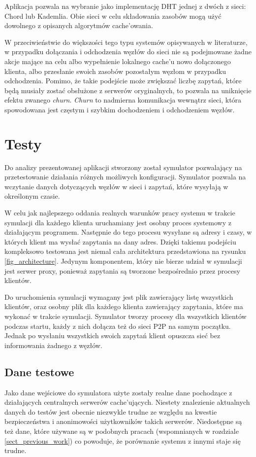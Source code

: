 \documentclass[a4paper,11pt]{scrartcl}
\newcommand{\s}{ }
\newcommand{\keszu}{cache'u}
\newcommand{\keszujacych}{cache'ujących}
\newcommand{\keszowania}{cache'owania}
\begin{document}
Aplikacja pozwala na wybranie jako implementację DHT jednej z dwóch z sieci: Chord lub Kademlia. Obie sieci w celu składowania zasobów mogą użyć dowolnego z opisanych algorytmów \keszowania.

W przeciwieństwie do większości tego typu systemów opisywanych w literaturze, w przypadku dołączania i odchodzenia węzłów do sieci nie są podejmowane żadne akcje mające na celu albo wypełnienie lokalnego \keszu\s nowo dołączonego klienta, albo przesłanie swoich zasobów pozostałym węzłom w przypadku odchodzenia. Pomimo, że takie podejście może zwiększać liczbę zapytań, które będą musiały zostać obsłużone z serwerów oryginalnych, to pozwala na uniknięcie efektu zwanego \textit{churn}. \textit{Churn} to nadmierna komunikacja wewnątrz sieci, która spowodowana jest częstym i szybkim dochodzeniem i odchodzeniem węzłów.  

\section{Testy}
\label{sect_tests}
Do analizy prezentowanej aplikacji stworzony został symulator pozwalający na przetestowanie działania różnych możliwych konfiguracji. Symulator pozwala na wczytanie danych dotyczących węzłów w sieci i zapytań, które wysyłają w określonym czasie. 

W celu jak najlepszego oddania realnych warunków pracy systemu w trakcie symulacji dla każdego klienta uruchamiany jest osobny proces systemowy z działającym programem. Następnie do tego procesu wysyłane są adresy i czasy, w których klient ma wysłać zapytania na dany adres. Dzięki takiemu podejściu kompleksowo testowana jest niemal cała architektura przedstawiona na rysunku \ref{fig_architecture}. Jedynym komponentem, który nie bierze udział w symulacji jest serwer proxy, ponieważ zapytania są tworzone bezpośrednio przez procesy klientów.

Do uruchomienia symulacji wymagany jest plik zawierający listę wszystkich klientów, oraz osobny plik dla każdego klienta zawierający zapytania, które ma wykonać w trakcie symulacji. Symulator tworzy procesy dla wszystkich klientów podczas startu, każdy z nich dołącza też do sieci P2P na samym początku. Jednak po wysłaniu wszystkich swoich zapytań klient opuszcza sieć bez informowania żadnego z węzłów.

\subsection{Dane testowe}
Jako dane wejściowe do symulatora użyte zostały realne dane pochodzące z działających centralnych serwerów \keszujacych. Niestety znalezienie aktualnych danych do testów jest obecnie niezwykle trudne ze względu na kwestie bezpieczeństwa i anonimowości użytkowników takich serwerów. Niedostępne są też dane, które używane są w podobnych pracach (wspomnianych w rozdziale \ref{sect_previous_work}) co powoduje, że porównanie systemu z innymi staje się trudne. 
\end{document}
